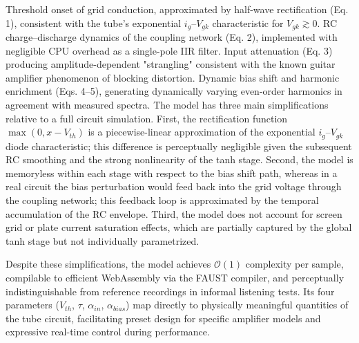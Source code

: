 Threshold onset of grid conduction, approximated by half-wave rectification (Eq. 1), consistent with the tube's exponential $i_g$–$V_{gk}$ characteristic for $V_{gk} \gtrsim 0$.
RC charge–discharge dynamics of the coupling network (Eq. 2), implemented with negligible CPU overhead as a single-pole IIR filter.
Input attenuation (Eq. 3) producing amplitude-dependent "strangling" consistent with the known guitar amplifier phenomenon of blocking distortion.
Dynamic bias shift and harmonic enrichment (Eqs. 4–5), generating dynamically varying even-order harmonics in agreement with measured spectra.
The model has three main simplifications relative to a full circuit simulation. First, the rectification function $\max(0, x - V_{th})$ is a piecewise-linear approximation of the exponential $i_g$–$V_{gk}$ diode characteristic; this difference is perceptually negligible given the subsequent RC smoothing and the strong nonlinearity of the tanh stage. Second, the model is memoryless within each stage with respect to the bias shift path, whereas in a real circuit the bias perturbation would feed back into the grid voltage through the coupling network; this feedback loop is approximated by the temporal accumulation of the RC envelope. Third, the model does not account for screen grid or plate current saturation effects, which are partially captured by the global tanh stage but not individually parametrized.

Despite these simplifications, the model achieves $\mathcal{O}(1)$ complexity per sample, compilable to efficient WebAssembly via the FAUST compiler, and perceptually indistinguishable from reference recordings in informal listening tests. Its four parameters ($V_{th}$, $\tau$, $\alpha_{in}$, $\alpha_{bias}$) map directly to physically meaningful quantities of the tube circuit, facilitating preset design for specific amplifier models and expressive real-time control during performance.

